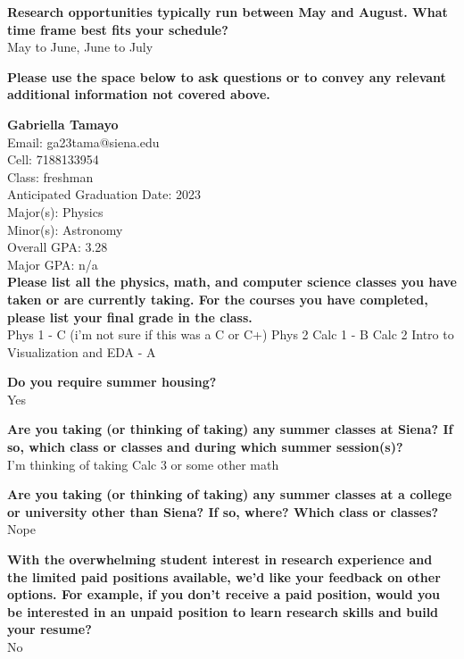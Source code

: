 \documentclass[12pt,preprint]{aastex}
\begin{document}
\vspace*{3mm}
{\bf Research opportunities typically run between May and August.  What time frame best fits your schedule?}\\
May to June, June to July

\vspace*{3mm}
{\bf Please use the space below to ask questions or to convey any relevant additional information not covered above.}\\
\vspace*{3mm}

\vspace*{3mm}
\clearpage
{\large {\bf Gabriella Tamayo}}\\
Email: ga23tama@siena.edu\\
Cell: 7188133954\\
Class: freshman\\
Anticipated Graduation Date: 2023\\
Major(s): Physics\\
Minor(s): Astronomy\\
Overall GPA: 3.28\\
Major GPA: n/a\\

 \vspace*{1mm}
{\bf Please list all the physics, math, and computer science classes you have taken or are currently taking.  For the courses you have completed, please list your final grade in the class.}\\
Phys 1 - C (i'm not sure if this was a C or C+) Phys 2 Calc 1 - B Calc 2 Intro to Visualization and EDA - A

\vspace*{3mm}
{\bf Do you require summer housing?}\\
Yes

\vspace*{3mm}
{\bf Are you taking (or thinking of taking) any summer classes at Siena?  If so, which class or classes and during which summer session(s)?}\\
I'm thinking of taking Calc 3 or some other math

\vspace*{3mm}
{\bf Are you taking (or thinking of taking) any summer classes at a college or university other than Siena?  If so, where?  Which class or classes?}\\
Nope

\vspace*{3mm}
{\bf With the overwhelming student interest in research experience and the limited paid positions available, we'd like your feedback on other options.  For example, if you don't receive a paid position, would you be interested in an unpaid position to learn research skills and build your resume?}\\
No
\end{document}
